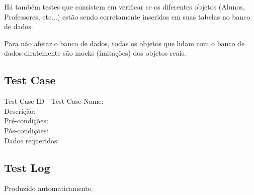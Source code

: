 \documentclass[12pt,letterpaper]{article}
\begin{document}
Há também testes que consistem em verificar se os diferentes objetos (Alunos, Professores, etc...) estão sendo corretamente inseridos em suas tabelas no banco de dados.

Para não afetar o banco de dados, todas os objetos que lidam com o banco de dados diratemente são mocks (imitações) dos objetos reais.

\subsection{Test Case}

\noindent Test Case ID - Test Case Name:\\
Descrição:\\ %
Pré-condições:\\ %
Pós-condições:\\ %
Dados requeridos:\\ %

\pagebreak

\subsection{Test Log}

Produzido automaticamente. %


%
\end{document}
